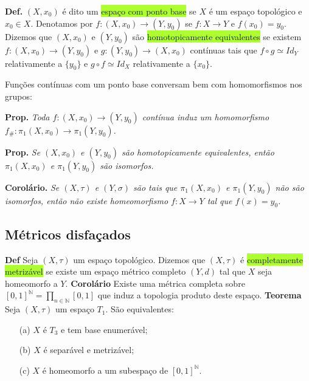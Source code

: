 \documentclass{article}
\begin{document}
\begin{landscape}
\begin{multicols}{3}
\textbf{Def.} $(X, x_0)$ é dito um \colorbox{GreenYellow}{espaço com ponto base} se $X$ é um espaço topológico e $x_0 \in X$. Denotamos por $f : (X, x_0) \rightarrow (Y, y_0)$ se $f : X \rightarrow Y$ e $f(x_0) = y_0$. Dizemos que $(X, x_0)$ e $(Y, y_0)$ são \colorbox{GreenYellow}{homotopicamente equivalentes} se existem $f : (X, x_0) \rightarrow (Y, y_0)$ e $g : (Y, y_0) \rightarrow (X, x_0)$ contínuas tais que $f \circ g \simeq Id_Y$ relativamente a $\{y_0\}$ e $g \circ f \simeq Id_X$ relativamente a $\{x_0\}$.

\medskip

\color{Emerald}Funções contínuas com um ponto base conversam bem com homomorfismos nos grupos:\color{black}

\medskip

\textbf{Prop.} \textit{Toda $f : (X, x_0) \rightarrow (Y, y_0)$ contínua induz um homomorfismo $f_{\#} : \pi_1(X, x_0) \rightarrow \pi_1(Y, y_0)$.}

\medskip

\textbf{Prop.} \textit{Se $(X, x_0)$ e $(Y, y_0)$ são homotopicamente equivalentes, então $\pi_1(X, x_0)$ e $\pi_1(Y, y_0)$ são isomorfos.}

\medskip
\textbf{Corolário.} \textit{Se $(X, \tau)$ e $(Y, \sigma)$ são tais que $\pi_1(X, x_0)$ e $\pi_1(Y, y_0)$ não são isomorfos, então não existe homeomorfismo $f : X \rightarrow Y$ tal que $f(x) = y_0$.}
\end{multicols}
\begin{center}
    
 \section{Métricos disfaçados}
\end{center}
 
\begin{multicols}{3}
    
\textbf{Def}  Seja \((X,\tau)\) um espaço topológico. Dizemos que \((X,\tau)\) é \colorbox{GreenYellow}{completamente metrizável} se existe um espaço métrico completo \((Y,d)\) tal que \(X\) seja homeomorfo a \(Y\).
\medskip
\textbf{Corolário } Existe uma métrica completa sobre \([0,1]^{\mathbb{N}} = \prod_{n\in\mathbb{N}}[0,1]\) que induz a topologia produto deste espaço.
\medskip
\textbf{Teorema} Seja \((X,\tau)\) um espaço \(T_1\). São equivalentes:
\begin{itemize}
  \item[(a)] \(X\) é \(T_3\) e tem base enumerável;
  \item[(b)] \(X\) é separável e metrizável;
  \item[(c)] \(X\) é homeomorfo a um subespaço de \([0,1]^{\mathbb{N}}\).
\end{itemize}


\end{multicols}
\end{landscape}
\end{document}
